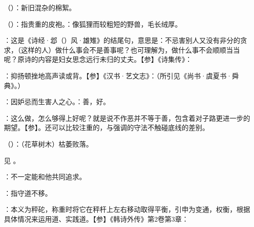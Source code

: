 {
\item {}（）：新旧混杂的棉絮。
\item {}（）：指贵重的皮袍。：像狐狸而较粗短的野兽，毛长绒厚。
\item {}：这是《诗经·邶（）风·雄雉》的结尾句，意思是：不忌害别人又没有非分的贪求，（这样的人）做什么事会不是善事呢？也可理解为，做什么事不会顺顺当当呢？原诗的内容是妇女思念远行未归的丈夫。【参】《诗集传》：

\item {}：抑扬顿挫地高声读或背。【参】《汉书·艺文志》：（所引见《尚书·虞夏书·舜典》。）

：因妒忌而生害人之心。：善，好。
\item {}：这么做，怎么够得上好呢？就是说不作恶并不等于善，包含着对子路更进一步的期望。【参】。还可以比较注重的，与强调的守法不触碰底线的差别。
}
{}


{
\item {}（）：（花草树木）枯萎败落。
}
{}


{
见 。
}
{}
%
%
%
%
%



{
\item {}：不一定能和他共同追求。
\item {}：指守道不移。
\item {}：本义为秤砣，称重时将它在秤杆上左右移动取得平衡，引申为变通，权衡，根据具体情况来运用道、实践道。【参】《韩诗外传》第2卷第3章：
}
{}


